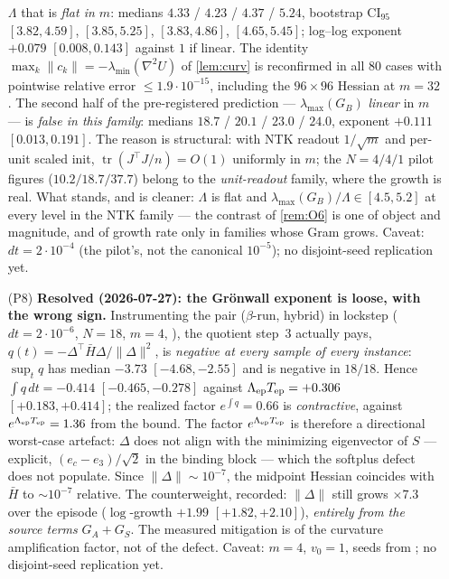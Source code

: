 \documentclass[11pt]{article}
\theoremstyle{remark}
\newcommand{\Tep}{T_{\mathrm{ep}}}
\begin{document}
\begin{itemize}
$\Lambda$ that is \emph{flat in $m$}: medians $4.33$ / $4.23$ / $4.37$ /
$5.24$, bootstrap CI$_{95}$ $[3.82,4.59]$, $[3.85,5.25]$, $[3.83,4.86]$,
$[4.65,5.45]$; log--log exponent $+0.079$ $[0.008,0.143]$ against $1$ if
linear. The identity $\max_k\|c_k\|=-\lambda_{\min}(\nabla^2U)$ of
\cref{lem:curv} is reconfirmed in all $80$ cases with pointwise relative error
$\le1.9\cdot10^{-15}$, including the $96\times96$ Hessian at $m=32$. The
second half of the pre-registered prediction --- $\lambda_{\max}(G_B)$
\emph{linear} in $m$ --- is \emph{false in this family}: medians $18.7$ /
$20.1$ / $23.0$ / $24.0$, exponent $+0.111$ $[0.013,0.191]$. The reason is
structural: with NTK readout $1/\sqrt m$ and per-unit scaled init,
$\operatorname{tr}(J^\top J/n)=O(1)$ uniformly in $m$; the $N=4/4/1$ pilot
figures ($10.2/18.7/37.7$) belong to the \emph{unit-readout} family, where the
growth is real. What stands, and is cleaner: $\Lambda$ is flat and
$\lambda_{\max}(G_B)/\Lambda\in[4.5,5.2]$ at every level in the NTK family ---
the contrast of \cref{rem:O6} is one of object and magnitude, and of growth
rate only in families whose Gram grows. Caveat: $dt=2\cdot10^{-4}$ (the
pilot's, not the canonical $10^{-5}$); no disjoint-seed replication yet.
\item[(P8)] \textbf{Resolved (2026-07-27): the Gr\"onwall exponent is loose,
with the wrong sign.} Instrumenting the pair ($\beta$-run, hybrid) in lockstep
($dt=2\cdot10^{-6}$, $N=18$, $m=4$, ), the quotient
step~3 actually pays,
$q(t)=-\Delta^\top\bar H\Delta/\|\Delta\|^2$, is \emph{negative at every
sample of every instance}: $\sup_t q$ has median $-3.73$ $[-4.68,-2.55]$ and
is negative in $18/18$. Hence $\int q\,dt=-0.414$ $[-0.465,-0.278]$ against
$\Lambda_{\rm ep}\Tep=+0.306$ $[+0.183,+0.414]$; the realized factor
$e^{\int q}=0.66$ is \emph{contractive}, against $e^{\Lambda_{\rm ep}\Tep}
=1.36$ from the bound. The factor $e^{\Lambda_{\rm ep}\Tep}$ is therefore a
directional worst-case artefact: $\Delta$ does not align with the minimizing
eigenvector of $S$ --- explicit, $(e_c-e_3)/\sqrt2$ in the binding block ---
which the softplus defect does not populate. Since $\|\Delta\|\sim10^{-7}$,
the midpoint Hessian coincides with $\bar H$ to $\sim10^{-7}$ relative. The
counterweight, recorded: $\|\Delta\|$ still grows $\times7.3$ over the episode
($\log$-growth $+1.99$ $[+1.82,+2.10]$), \emph{entirely from the source terms}
$G_A+G_S$. The measured mitigation is of the curvature amplification factor,
not of the defect. Caveat: $m=4$, $v_0=1$, seeds from
; no disjoint-seed replication yet.

\end{itemize}
\end{document}
